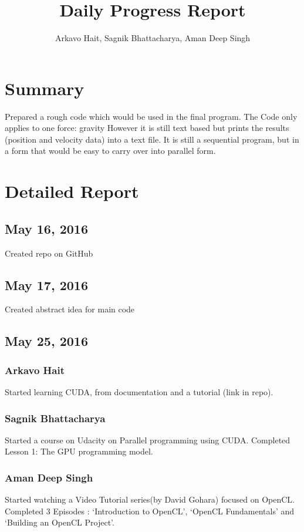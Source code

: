\documentclass{article}
\title{Daily Progress Report}
\author{Arkavo Hait, Sagnik Bhattacharya, Aman Deep Singh}
\begin{document}
\maketitle
\section*{Summary}
Prepared a rough code which would be used in the final program.
The Code only applies to one force: gravity
However it is still text based but prints the results (position and velocity data) into a text file. It is still a sequential program, but in a form that would be easy to carry over into parallel form.
\section*{Detailed Report}
\subsection*{May 16, 2016}
Created repo on GitHub
\subsection*{May 17, 2016}
Created abstract idea for main code
\subsection*{May 25, 2016}
\subsubsection*{Arkavo Hait}
Started learning CUDA, from documentation and a tutorial (link in repo).
\subsubsection*{Sagnik Bhattacharya}
Started a course on Udacity on Parallel programming using CUDA. Completed Lesson 1: The GPU programming model.
\subsubsection*{Aman Deep Singh}
Started watching a Video Tutorial series(by David Gohara) focused on OpenCL. Completed 3 Episodes : `Introduction to OpenCL', `OpenCL Fundamentals' and `Building an OpenCL Project'.
\end{document}
